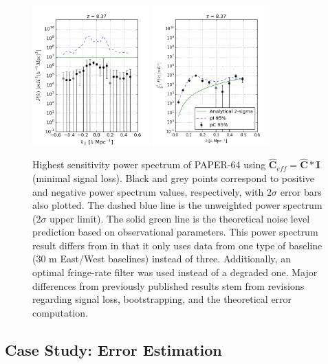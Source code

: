 \documentclass[preprint2,numberedappendix,tighten]{aastex6}  %
\begin{document}
\begin{figure}
	\centering
	\includegraphics[width=0.4\textwidth]{plots/ps1_data_nosigloss.png}
	\includegraphics[width=0.4\textwidth]{plots/ps2_data_nosigloss.png}
	\caption{Highest sensitivity power spectrum of PAPER-64 using $\hat{\textbf{C}}_{eff} = \hat{\textbf{C}} * \textbf{I}$ (minimal signal loss). Black and grey points correspond to positive and negative power spectrum values, respectively, with $2\sigma$ error bars also plotted. The dashed blue line is the unweighted power spectrum ($2\sigma$ upper limit). The solid green line is the theoretical noise level prediction based on observational parameters. This power spectrum result differs from \citet{ali_et_al2015} in that it only uses data from one type of baseline ($30$ m East/West baselines) instead of three. Additionally, an optimal fringe-rate filter was used instead of a degraded one. Major differences from previously published results stem from revisions regarding signal loss, bootstrapping, and the theoretical error computation.}
	\label{fig:ps1_data}
\end{figure}

\subsection{Case Study: Error Estimation}
\label{sec:Error}
\end{document}
